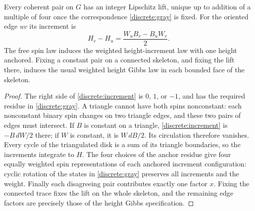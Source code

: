 \begin{lemma}\label{lem:spin-lift}
Every coherent pair on $G$ has an integer Lipschitz lift, unique up to addition
of a multiple of four once the correspondence \eqref{discrete:gray} is fixed.
For the oriented edge $uv$ its increment is
\begin{equation}\label{discrete:increment}
 H_v-H_u=\frac{W_uB_v-B_uW_v}{2}.
\end{equation}
The free spin law induces the weighted height-increment law with one height
anchored. Fixing a constant pair on a connected skeleton, and fixing the lift
there, induces the usual weighted height Gibbs law in each bounded face of
the skeleton.
\end{lemma}
\begin{proof}
The right side of \eqref{discrete:increment} is $0$, $1$, or $-1$, and has
the required residue in \eqref{discrete:gray}. A triangle cannot have both
spins nonconstant: each nonconstant binary spin changes on two triangle
edges, and these two pairs of edges must intersect. If $B$ is constant on a
triangle, \eqref{discrete:increment} is $-B\,dW/2$ there; if $W$ is constant,
it is $W\,dB/2$. Its circulation therefore vanishes. Every cycle of the
triangulated disk is a sum of its triangle boundaries, so the increments
integrate to $H$. The four choices of the anchor residue give four equally
weighted spin representations of each anchored increment configuration:
cyclic rotation of the states in \eqref{discrete:gray} preserves all
increments and the weight. Finally each disagreeing pair contributes exactly
one factor $x$. Fixing the connected trace fixes the lift on the whole
skeleton, and the remaining edge factors are precisely those of the height
Gibbs specification.
\end{proof}

